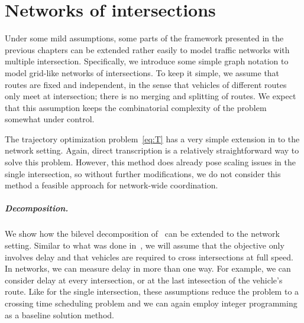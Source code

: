 \documentclass{report}
\theoremstyle{definition}
\theoremstyle{plain}
\begin{document}



\chapter{Networks of intersections}\label{chap:network-learning}

Under some mild assumptions, some parts of the framework presented in the
previous chapters can be extended rather easily to model traffic networks with
multiple intersection.
%
Specifically, we introduce some simple graph notation to model grid-like
networks of intersections. To keep it simple, we assume that routes are fixed
and independent, in the sense that vehicles of different routes only meet at
intersection; there is no merging and splitting of routes.
%
We expect that this assumption keeps the combinatorial complexity of the problem
somewhat under control.

The trajectory optimization problem~\eqref{eq:T} has a very simple extension in to the
network setting.
%
Again, direct transcription is a relatively straightforward way to solve this
problem. However, this method does already pose scaling issues in the single
intersection, so without further modifications, we do not consider this method a
feasible approach for network-wide coordination.

\paragraph{Decomposition.}

We show how the bilevel decomposition of~ can
be extended to the network setting.
%
Similar to what was done in~, we will assume that
the objective only involves delay and that vehicles are required to cross
intersections at full speed.
%
In networks, we can measure delay in more than one way. For example, we can
consider delay at every intersection, or at the last intesection of the
vehicle's route.
%
Like for the single intersection, these assumptions reduce the problem to a
crossing time scheduling problem and we can again employ integer programming as
a baseline solution method.
\end{document}
